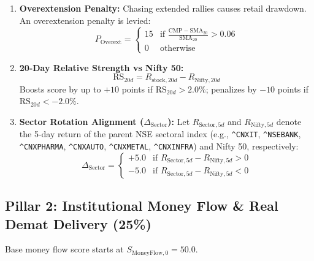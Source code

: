 \documentclass[11pt,a4paper]{article}
\begin{document}
\begin{enumerate}
    \item \textbf{Overextension Penalty:}
    Chasing extended rallies causes retail drawdown. An overextension penalty is levied:
    \begin{equation}
    P_{\text{Overext}} = \begin{cases} 15 & \text{if } \frac{\text{CMP} - \text{SMA}_{20}}{\text{SMA}_{20}} > 0.06 \\ 0 & \text{otherwise} \end{cases}
    \end{equation}

    \item \textbf{20-Day Relative Strength vs Nifty 50:}
    \begin{equation}
    \text{RS}_{20d} = R_{\text{stock}, 20d} - R_{\text{Nifty}, 20d}
    \end{equation}
    Boosts score by up to $+10$ points if $\text{RS}_{20d} > 2.0\%$; penalizes by $-10$ points if $\text{RS}_{20d} < -2.0\%$.

    \item \textbf{Sector Rotation Alignment ($\Delta_{\text{Sector}}$):}
    Let $R_{\text{Sector}, 5d}$ and $R_{\text{Nifty}, 5d}$ denote the 5-day return of the parent NSE sectoral index (e.g., \texttt{\^{}CNXIT}, \texttt{\^{}NSEBANK}, \texttt{\^{}CNXPHARMA}, \texttt{\^{}CNXAUTO}, \texttt{\^{}CNXMETAL}, \texttt{\^{}CNXINFRA}) and Nifty 50, respectively:
    \begin{equation}
    \Delta_{\text{Sector}} = \begin{cases}
    +5.0 & \text{if } R_{\text{Sector}, 5d} - R_{\text{Nifty}, 5d} > 0 \\
    -5.0 & \text{if } R_{\text{Sector}, 5d} - R_{\text{Nifty}, 5d} < 0
    \end{cases}
    \end{equation}
\end{enumerate}

\subsection{Pillar 2: Institutional Money Flow \& Real Demat Delivery (25\%)}
Base money flow score starts at $S_{\text{MoneyFlow}, 0} = 50.0$.
\end{document}

